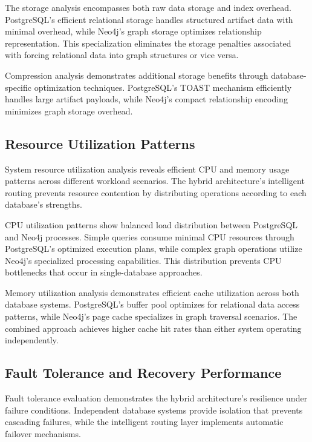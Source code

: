 The storage analysis encompasses both raw data storage and index overhead. PostgreSQL's efficient relational storage handles structured artifact data with minimal overhead, while Neo4j's graph storage optimizes relationship representation. This specialization eliminates the storage penalties associated with forcing relational data into graph structures or vice versa.

Compression analysis demonstrates additional storage benefits through database-specific optimization techniques. PostgreSQL's TOAST mechanism efficiently handles large artifact payloads, while Neo4j's compact relationship encoding minimizes graph storage overhead.

\subsection*{Resource Utilization Patterns}

System resource utilization analysis reveals efficient CPU and memory usage patterns across different workload scenarios. The hybrid architecture's intelligent routing prevents resource contention by distributing operations according to each database's strengths.

CPU utilization patterns show balanced load distribution between PostgreSQL and Neo4j processes. Simple queries consume minimal CPU resources through PostgreSQL's optimized execution plans, while complex graph operations utilize Neo4j's specialized processing capabilities. This distribution prevents CPU bottlenecks that occur in single-database approaches.

Memory utilization analysis demonstrates efficient cache utilization across both database systems. PostgreSQL's buffer pool optimizes for relational data access patterns, while Neo4j's page cache specializes in graph traversal scenarios. The combined approach achieves higher cache hit rates than either system operating independently.

\subsection*{Fault Tolerance and Recovery Performance}

Fault tolerance evaluation demonstrates the hybrid architecture's resilience under failure conditions. Independent database systems provide isolation that prevents cascading failures, while the intelligent routing layer implements automatic failover mechanisms.

